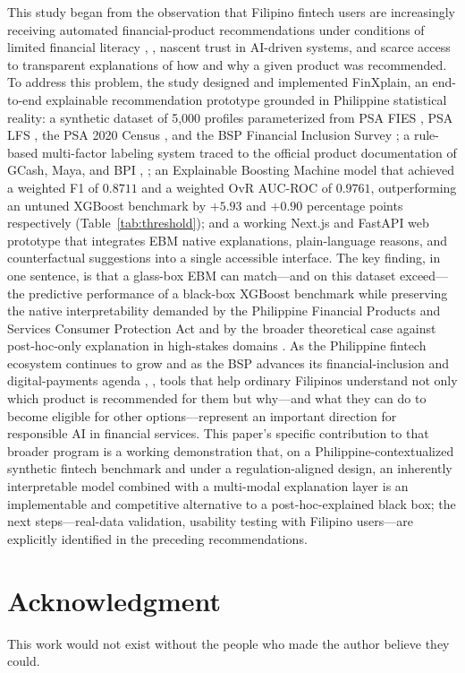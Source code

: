 \documentclass[journal]{./IEEE/IEEEtran}
\begin{document}
This study began from the observation that Filipino fintech users are increasingly receiving automated financial-product recommendations under conditions of limited financial literacy \cite{ref4}, \cite{ref43}, nascent trust in AI-driven systems, and scarce access to transparent explanations of how and why a given product was recommended. To address this problem, the study designed and implemented FinXplain, an end-to-end explainable recommendation prototype grounded in Philippine statistical reality: a synthetic dataset of 5{,}000 profiles parameterized from PSA FIES \cite{ref40}, PSA LFS \cite{ref41}, the PSA 2020 Census \cite{ref39}, and the BSP Financial Inclusion Survey \cite{ref35}; a rule-based multi-factor labeling system traced to the official product documentation of GCash, Maya, and BPI \cite{ref6}, \cite{ref37}; an Explainable Boosting Machine model that achieved a weighted F1 of $0.8711$ and a weighted OvR AUC-ROC of $0.9761$, outperforming an untuned XGBoost benchmark by $+5.93$ and $+0.90$ percentage points respectively (Table~\ref{tab:threshold}); and a working Next.js and FastAPI web prototype that integrates EBM native explanations, plain-language reasons, and counterfactual suggestions into a single accessible interface. The key finding, in one sentence, is that a glass-box EBM can match---and on this dataset exceed---the predictive performance of a black-box XGBoost benchmark while preserving the native interpretability demanded by the Philippine Financial Products and Services Consumer Protection Act \cite{ref44} and by the broader theoretical case against post-hoc-only explanation in high-stakes domains \cite{ref51}. As the Philippine fintech ecosystem continues to grow and as the BSP advances its financial-inclusion and digital-payments agenda \cite{ref35}, \cite{ref75}, tools that help ordinary Filipinos understand not only which product is recommended for them but why---and what they can do to become eligible for other options---represent an important direction for responsible AI in financial services. This paper's specific contribution to that broader program is a working demonstration that, on a Philippine-contextualized synthetic fintech benchmark and under a regulation-aligned design, an inherently interpretable model combined with a multi-modal explanation layer is an implementable and competitive alternative to a post-hoc-explained black box; the next steps---real-data validation, usability testing with Filipino users---are explicitly identified in the preceding recommendations.
\newpage
\section*{Acknowledgment}
This work would not exist without the people who made the author believe they could.
\end{document}
